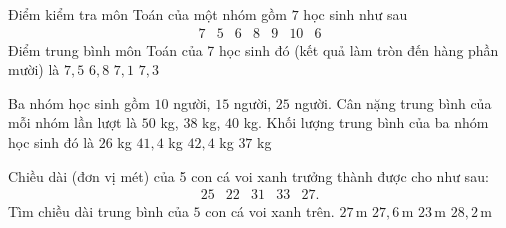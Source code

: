 

\begin{ex}%
	Điểm kiểm tra môn Toán của một nhóm gồm $7$ học sinh như  sau
	$$\begin{array}{llllllll}7 & 5 & 6 & 8 & 9 & 10 & 6
\end{array}$$
Điểm trung bình môn Toán  của 7 học sinh đó (kết quả làm tròn đến hàng phần mười) là
\choice 
	 {$7{,}5$}
	 {$6{,}8$}
	 {$7{,}1$}
	{\True  $7{,}3$}
\end{ex}

\begin{ex}%
	Ba nhóm học sinh gồm $10$ người, $15$ người, $25$ người.  Cân nặng trung bình của mỗi nhóm lần lượt là $50$ kg, $38$ kg, $40$ kg. Khối lượng trung bình của ba nhóm học sinh đó là
	\choice 
		{$26$  kg}
		{\True $41{,}4$ kg} 
		{$42{,}4$ kg} 
		{$37$  kg}
\end{ex}

\begin{ex}%
	Chiều dài (đơn vị  mét) của 5 con cá voi xanh trưởng thành được cho như sau:
	$$ 
	\begin{array}{lllll}
		25 &  22 & 31 & 33 & 27.
	\end{array}
	$$ 
	Tìm chiều dài trung bình của $5$ con  cá voi xanh trên.
	\choice 
		 {$27$\,m}
		{\True $27{,}6$\,m} 
		 {$23$\,m}
		 {$28{,}2$\,m}
\end{ex}

